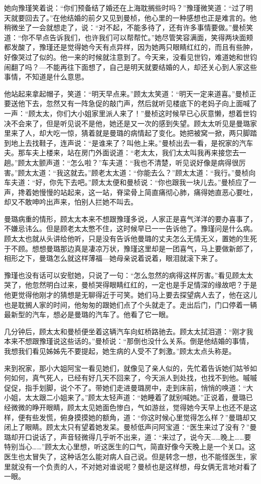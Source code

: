 \par 她向豫瑾笑着说：“你们预备结了婚还在上海耽搁些时吗？”豫瑾微笑道：“过了明天就要回去了。”在他结婚的前夕又见到曼桢，他心里的一种感想也正是难言的。他稍微坐了一会就想走了，说：“对不起，不能多待了，还有许多事情要做。”曼桢笑道：“你不早点告诉我们，也许我们可以帮帮忙。”她尽管笑容满面，笑得两块面颊都发酸了，豫瑾还是觉得她今天有点异样，因为她两只眼睛红红的，而且有些肿，好像哭过了似的。他一来的时候就注意到了。今天来，没看见世钧，难道她和世钧闹翻了吗？—不能再往下面想了，自己是明天就要结婚的人，却还关心到人家这些事情，不知道是什么意思。
\par 他站起来拿起帽子，笑道：“明天早点来。”顾太太笑道：“明天一定来道喜。”曼桢正要送他下去，忽然又有一阵急促的敲门声，然后就听见楼底下的老妈子向上面喊了一声：“顾太太，你们大小姐家里派人来了！”曼桢这时候早已心灰意懒，想着世钧决不会来了，但是听见说不是他，她还是又一次的感到失望。顾太太听见是曼璐家里来了人，却大吃一惊，猜着就是曼璐的病情起了变化。她把被窝一掀，两只脚踏到地上去找鞋子，连声说：“是谁来了？叫他上来。”曼桢出去一看，是祝家的汽车夫。那车夫上楼来，站在房门外面说道：“老太太，我们太太叫我再来接您去一趟。”顾太太颤声道：“怎么啦？”车夫道：“我也不清楚，听见说好像是病得很厉害。”顾太太道：“我这就去。”顾老太太道：“你能去么？”顾太太道：“我行。”曼桢向车夫道：“好，你先下去吧。”顾太太便和曼桢说：“你也跟我一块儿去。”曼桢应了一声，搀着她慢慢的站起来，这一站，脊梁骨上简直痛彻心肺，痛得她直恶心要吐，却又不敢呻吟出声来，怕别人拦她不叫去。
\par 曼璐病重的情形，顾太太本来不想跟豫瑾多说，人家正是喜气洋洋的要办喜事了，不嫌忌讳么。但是顾老太太憋不住，这时候早已一一告诉他了。豫瑾问是什么病。顾太太也就从头讲给他听，只是没有告诉他曼璐的丈夫怎么无情无义，置她的生死于不顾。想想曼璐那边真是凄凉万状，豫瑾这里却是一团喜气，马上要做新郎了，相形之下，曼璐怎么就这样薄福—她母亲说着说着，眼泪就滚下来了。
\par 豫瑾也没有话可以安慰她，只说了一句：“怎么忽然的病得这样厉害。”看见顾太太哭了，他忽然明白过来，曼桢哭得眼睛红红的，一定也是手足情深的缘故吧？于是他更觉得他刚才的猜想是无聊得近于可笑。她们马上要去探望病人去了，他在这儿也是耽搁人家的时间，他匆匆的跟她们点了个头就走了。走出后门，门口停着一辆最新型的汽车，想必是曼璐的汽车了。他看了它一眼。
\par 几分钟后，顾太太和曼桢便坐着这辆汽车向虹桥路驰去。顾太太拭泪道：“刚才我本来不想跟豫瑾说这些话的。”曼桢说：“那倒也没什么关系。倒是他结婚的事情，我想我们看见姊姊先不要提起，她生病的人受不了刺激。”顾太太点头称是。
\par 来到祝家，那小大姐阿宝一看见她们，就像见了亲人似的，先忙着告诉她们姑爷如何如何，真气死人，已经有好几天不回来了，今天派人到处找，也找不到他。嘁嘁促促，指手划脚，说个不了。带她们走进曼璐房中，走到床前，悄悄的唤道：“大小姐，太太跟二小姐来了。”顾太太轻声道：“她睡着了就别喊她。”正说着，曼璐已经微微的睁开眼睛，顾太太见她面色惨白，气如游丝，觉得她今天早上也还不是这样，便有些发慌，俯身摸摸她的额角，道：“你这时候心里觉得怎么样？”曼璐却又闭上了眼睛。顾太太只有望着她发呆。曼桢低声问阿宝道：“医生来过了没有？”曼璐却开口说话了，声音轻微得几乎听不出来，道：“来过了，说今天……晚上……要特别当心……”顾太太心里想，听这医生的口气，简直好像今天晚上是一个关口。这医生也太冒失了，这种话怎么能对病人自己说。但是转念一想，也不能怪医生，家里就没有一个负责的人，不对她对谁说呢？曼桢也是这样想，母女俩无言地对看了一眼。
